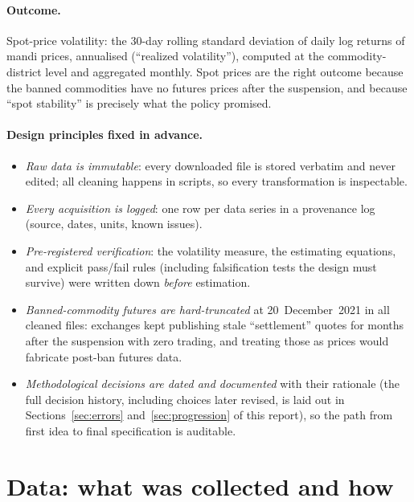 \documentclass[11pt]{article}
\begin{document}
\paragraph{Outcome.} Spot-price volatility: the 30-day rolling standard deviation of
daily log returns of mandi prices, annualised (``realized volatility''), computed at the
commodity-district level and aggregated monthly. Spot prices are the right outcome
because the banned commodities have no futures prices after the suspension, and because
``spot stability'' is precisely what the policy promised.

\paragraph{Design principles fixed in advance.}
\begin{itemize}[leftmargin=1.6em,itemsep=1pt]
  \item \emph{Raw data is immutable}: every downloaded file is stored verbatim and never
        edited; all cleaning happens in scripts, so every transformation is inspectable.
  \item \emph{Every acquisition is logged}: one row per data series in a provenance log
        (source, dates, units, known issues).
  \item \emph{Pre-registered verification}: the volatility measure, the estimating
        equations, and explicit pass/fail rules (including falsification tests the design
        must survive) were written down \emph{before} estimation.
  \item \emph{Banned-commodity futures are hard-truncated} at 20~December~2021 in all
        cleaned files: exchanges kept publishing stale ``settlement'' quotes for months
        after the suspension with zero trading, and treating those as prices would
        fabricate post-ban futures data.
  \item \emph{Methodological decisions are dated and documented} with their rationale
        (the full decision history, including choices later revised, is laid out in
        Sections~\ref{sec:errors} and~\ref{sec:progression} of this report), so the path
        from first idea to final specification is auditable.
\end{itemize}

\section{Data: what was collected and how}
\label{sec:data}
\end{document}
